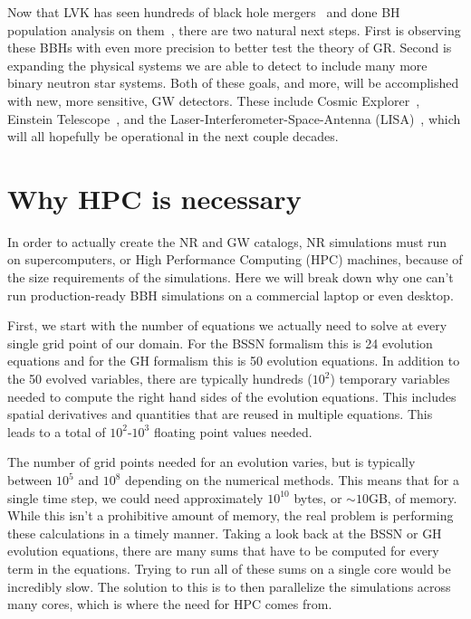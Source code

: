 \begin{bibunit}[unsrtnat]
Now that LVK has seen hundreds of black hole mergers~\cite{KAGRA:2021vkt} and
done BH population analysis on them~\cite{KAGRA:2021duu}, there are two natural
next steps. First is observing these BBHs with even more precision to better
test the theory of GR. Second is expanding the physical systems we are able to
detect to include many more binary neutron star systems. Both of these goals,
and more, will be accomplished with new, more sensitive, GW detectors. These
include Cosmic Explorer~\cite{Evans:2021gyd,Evans:2023eyw}, Einstein
Telescope~\cite{Maggiore:2019uih,Branchesi:2023mws}, and the
Laser-Interferometer-Space-Antenna
(LISA)~\cite{LISA:2017pwj,Amaro-Seoane:2022rxf,Colpi:2024xhw}, which will all
hopefully be operational in the next couple decades.

\section{Why HPC is necessary\label{sec:intro_why_hpc}}
In order to actually create the NR and GW catalogs, NR simulations must run on
supercomputers, or High Performance Computing (HPC) machines, because of the size
requirements of the simulations. Here we will break down why one can't run
production-ready BBH simulations on a commercial laptop or even desktop.

First, we start with the number of equations we actually need to solve at every
single grid point of our domain. For the BSSN formalism this is 24 evolution
equations and for the GH formalism this is 50 evolution equations. In addition
to the 50 evolved variables, there are typically hundreds ($10^2$) temporary
variables needed to compute the right hand sides of the evolution equations.
This includes spatial derivatives and quantities that are reused in multiple
equations. This leads to a total of $10^2$-$10^3$ floating point values needed.

The number of grid points needed for an evolution varies, but is typically
between $10^5$ and $10^8$ depending on the numerical methods. This means that
for a single time step, we could need approximately $10^{10}$ bytes, or $\sim
10$GB, of memory. While this isn't a prohibitive amount of memory, the real
problem is performing these calculations in a timely manner. Taking a look back
at the BSSN or GH evolution equations, there are many sums that have to be
computed for every term in the equations. Trying to run all of these sums on a
single core would be incredibly slow. The solution to this is to then
parallelize the simulations across many cores, which is where the need for HPC
comes from.


\end{bibunit}
